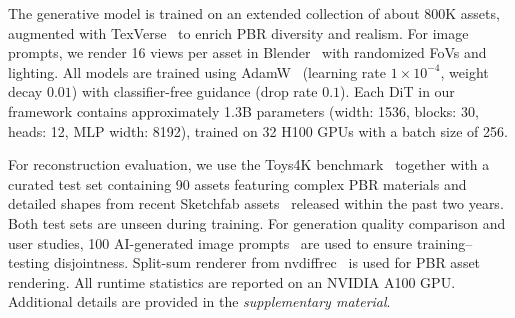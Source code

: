 \documentclass[10pt,twocolumn,letterpaper]{article}
\begin{document}
The generative model is trained on an extended collection of about 800K assets, augmented with TexVerse~\cite{zhang2025texverse} to enrich PBR diversity and realism.
For image prompts, we render 16 views per asset in Blender~\cite{blender} with randomized FoVs and lighting.
All models are trained using AdamW~\cite{loshchilov2017decoupled} (learning rate $1\times10^{-4}$, weight decay $0.01$) with classifier-free guidance (drop rate $0.1$).
Each DiT in our framework contains approximately 1.3B parameters (width: 1536, blocks: 30, heads: 12, MLP width: 8192),
trained on 32 H100 GPUs with a batch size of 256.

For reconstruction evaluation, we use the Toys4K benchmark~\cite{stojanov2021using} together with a curated test set containing 90 assets featuring complex PBR materials and detailed shapes from recent Sketchfab assets~\cite{sketchfab2025} released within the past two years. Both test sets are unseen during training.
For generation quality comparison and user studies, 100 AI-generated image prompts~\cite{fortin2025nanobanana} are used to ensure training–testing disjointness.
Split-sum renderer from nvdiffrec~\cite{munkberg2022extracting} is used for PBR asset rendering. All runtime statistics are reported on an NVIDIA A100 GPU.
Additional details are provided in the \emph{supplementary material}.
\end{document}
